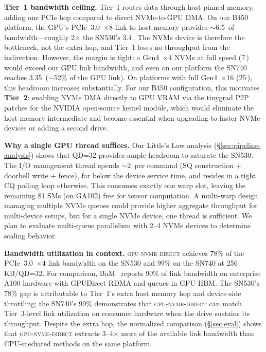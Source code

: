 \documentclass{article}
\newcommand{\sysname}{\textsc{gpu-nvme-direct}}
\newcommand{\us}{\,\text{\textmu s}}
\newcommand{\GBs}{\,\text{GB/s}}
\begin{document}
\textbf{Tier~1 bandwidth ceiling.} Tier~1 routes data through host pinned
memory, adding one PCIe hop compared to direct NVMe-to-GPU DMA. On our B450
platform, the GPU's PCIe~3.0~$\times$8 link to host memory provides
$\sim$6.5\GBs{} of bandwidth---roughly 2$\times$ the SN530's 3.4\GBs{}.
The NVMe device is therefore the bottleneck, not the extra hop, and Tier~1
loses no throughput from the indirection. However, the margin is tight: a
Gen4~$\times$4 NVMe at full speed (7\GBs{}) would exceed our GPU link
bandwidth, and even on our platform the SN740 reaches 3.35\GBs{} ($\sim$52\%
of the GPU link). On platforms with full Gen4~$\times$16 (25\GBs{}), this
headroom increases substantially. For our B450 configuration, this motivates
\textbf{Tier~2}: enabling NVMe DMA directly to GPU VRAM via the tinygrad P2P
patches for the NVIDIA open-source kernel module, which would eliminate the
host memory intermediate and become essential when upgrading to faster NVMe
devices or adding a second drive.

\textbf{Why a single GPU thread suffices.} Our Little's Law analysis
(\S\ref{sec:pipeline-analysis}) shows that QD=32 provides ample headroom to
saturate the SN530. The I/O management thread spends $\sim$2\us{} per command
(SQ construction + doorbell write + fence), far below the device service time,
and resides in a tight CQ polling loop otherwise. This consumes exactly one
warp slot, leaving the remaining 81 SMs (on GA102) free for tensor computation.
A multi-warp design managing multiple NVMe queues could provide higher
aggregate throughput for multi-device setups, but for a single NVMe device, one
thread is sufficient. We plan to evaluate multi-queue parallelism with 2--4
NVMe devices to determine scaling behavior.

\textbf{Bandwidth utilization in context.} \sysname{} achieves 78\% of the
PCIe~3.0~$\times$4 link bandwidth on the SN530 and 99\% on the SN740 at
256\,KB/QD=32. For comparison, BaM~\cite{qureshi2023bam} reports 90\% of link
bandwidth on enterprise A100 hardware with GPUDirect RDMA and queues in GPU
HBM. The SN530's 78\% gap is attributable to Tier~1's extra host memory hop
and device-side throttling; the SN740's 99\% demonstrates that \sysname{} can
match Tier~3-level link utilization on consumer hardware when the drive sustains
its throughput. Despite the extra hop, the normalized comparison
(\S\ref{sec:eval}) shows that \sysname{} extracts 3--4$\times$ more of the
available link bandwidth than CPU-mediated methods on the same platform.
\end{document}
